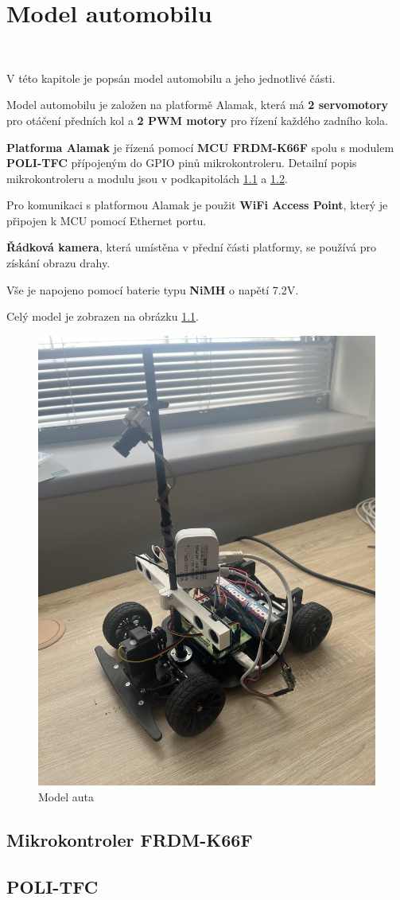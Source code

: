 \chapter{Model automobilu}
\label{sec:CarModel} \

V této kapitole je popsán model automobilu a jeho jednotlivé části.

Model automobilu je založen na platformě Alamak, která má
\textbf{2 servomotory} pro otáčení předních kol a
\textbf{2 PWM motory} pro řízení každého
zadního kola.

\textbf{Platforma Alamak} je řízená pomocí \textbf{MCU FRDM-K66F}\cite{frdmk66UserGuide} spolu
s modulem \textbf{POLI-TFC} přípojeným do GPIO pinů mikrokontroleru.
Detailní popis mikrokontroleru a modulu jsou v podkapitolách \ref{sec:FRDM-K66F}
a \ref{sec:POLI-TFC}.

Pro komunikaci s platformou Alamak je použit \textbf{WiFi Access Point}, který je připojen k MCU
pomocí Ethernet portu.

\textbf{Řádková kamera}, která umístěna v přední části platformy,
se používá pro získání obrazu drahy.

Vše je napojeno pomocí baterie typu \textbf{NiMH} o napětí 7.2V.

Celý model je zobrazen na obrázku \ref{fig:car}.
\begin{figure}[h]
    \centering
    \includegraphics[width=0.45\linewidth, angle=-90]{Figures/car.jpeg}
    \caption{Model auta}
    \label{fig:car}
\end{figure}

\section{Mikrokontroler FRDM-K66F}
\label{sec:FRDM-K66F}

\section{POLI-TFC}
\label{sec:POLI-TFC}

\endinput
